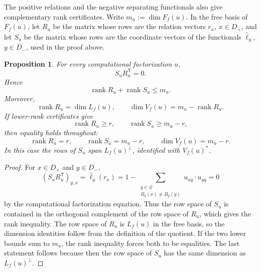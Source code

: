 \documentclass[11pt]{article}
\numberwithin{equation}{section}
\newtheorem{proposition}[definition]{Proposition}
\theoremstyle{remark}
\begin{document}
The positive relations and the negative separating functionals also give
complementary rank certificates. Write $m_u:=\dim F_f(u)$. In the free
basis of $F_f(u)$, let $R_u$ be the matrix whose rows are the relation
vectors $r_x$, $x\in D_+$, and let $S_u$ be the matrix whose rows are the
coordinate vectors of the functionals $\widehat\ell_y$, $y\in D_-$, used
in the proof above.

\begin{proposition}
\label{prop:quotient-complementary-rank}
For every computational factorization $u$,
\begin{equation}
    S_uR_u^{\mathsf T}=0.
\end{equation}
Hence
\begin{equation}
    \operatorname{rank}R_u+\operatorname{rank}S_u\leq m_u.
\end{equation}
Moreover,
\begin{equation}
    \operatorname{rank}R_u=\dim L_f(u),
    \qquad
    \dim V_f(u)=m_u-\operatorname{rank}R_u.
\end{equation}
If lower-rank certificates give
\begin{equation}
    \operatorname{rank}R_u\geq r,
    \qquad
    \operatorname{rank}S_u\geq m_u-r,
\end{equation}
then equality holds throughout:
\begin{equation}
    \operatorname{rank}R_u=r,
    \qquad
    \operatorname{rank}S_u=m_u-r,
    \qquad
    \dim V_f(u)=m_u-r.
\end{equation}
In this case the rows of $S_u$ span $L_f(u)^\perp$, identified with
$V_f(u)^*$.
\end{proposition}

\begin{proof}
For $x\in D_+$ and $y\in D_-$,
\begin{equation}
    (S_uR_u^{\mathsf T})_{y,x}
    =
    \widehat\ell_y(r_x)
    =
    1-
    \sum_{\substack{q\in\mathcal Q\\
                    B_q(x)\neq B_q(y)}}
        u_{xq}\mathbin{\cdot}u_{yq}
    =
    0
\end{equation}
by the computational factorization equation. Thus the row space of $S_u$
is contained in the orthogonal complement of the row space of $R_u$, which
gives the rank inequality. The row space of $R_u$ is $L_f(u)$ in the free
basis, so the dimension identities follow from the definition of the
quotient. If the two lower bounds sum to $m_u$, the rank inequality forces
both to be equalities. The last statement follows because then the row space
of $S_u$ has the same dimension as $L_f(u)^\perp$.
\end{proof}
\end{document}
